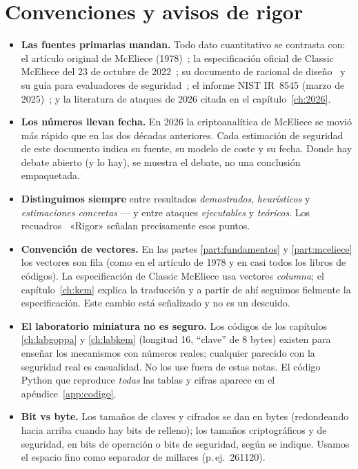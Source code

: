 \documentclass[11pt,a4paper,oneside]{report}
\begin{document}
\section*{Convenciones y avisos de rigor}
\begin{itemize}[leftmargin=1.4em,itemsep=2pt]
  \item \textbf{Las fuentes primarias mandan.} Todo dato cuantitativo se contrasta con:
        el artículo original de McEliece (1978)~\cite{mceliece1978}; la especificación
        oficial de Classic McEliece del 23 de octubre de
        2022~\cite{cmspec}; su documento de racional de diseño~\cite{cmrationale} y su
        guía para evaluadores de seguridad~\cite{cmsecurity}; el informe NIST IR~8545
        (marzo de 2025)~\cite{nist8545}; y la literatura de ataques de 2026 citada en el
        capítulo~\ref{ch:2026}.
  \item \textbf{Los números llevan fecha.} En 2026 la criptoanalítica de McEliece se
        movió más rápido que en las dos décadas anteriores. Cada estimación de seguridad
        de este documento indica su fuente, su modelo de coste y su fecha. Donde hay
        debate abierto (y lo hay), se muestra el debate, no una conclusión empaquetada.
  \item \textbf{Distinguimos siempre} entre resultados \emph{demostrados},
        \emph{heurísticos} y \emph{estimaciones concretas} --- y entre ataques
        \emph{ejecutables} y \emph{teóricos}. Los recuadros
        \textcolor{mcred}{\faBalanceScale\ «Rigor»} señalan precisamente esos puntos.
  \item \textbf{Convención de vectores.} En las partes \ref{part:fundamentos} y
        \ref{part:mceliece} los vectores son fila (como en el artículo de 1978 y en casi
        todos los libros de códigos). La especificación de Classic McEliece usa vectores
        \emph{columna}; el capítulo~\ref{ch:kem} explica la traducción y a partir de ahí
        seguimos fielmente la especificación. Este cambio está señalizado y no es un
        descuido.
  \item \textbf{El laboratorio miniatura no es seguro.} Los códigos de los capítulos
        \ref{ch:labgoppa} y \ref{ch:labkem} (longitud 16, ``clave'' de 8 bytes) existen
        para enseñar los mecanismos con números reales; cualquier parecido con la
        seguridad real es casualidad. No los use fuera de estas notas. El código Python
        que reproduce \emph{todas} las tablas y cifras aparece en el
        apéndice~\ref{app:codigo}.
  \item \textbf{Bit vs byte.} Los tamaños de claves y cifrados se dan en bytes
        (redondeando hacia arriba cuando hay bits de relleno); los tamaños
        criptográficos y de seguridad, en bits de operación o bits de seguridad, según se
        indique. Usamos el espacio fino como separador de millares (p.\,ej.\ \num{261120}).
\end{itemize}
\end{document}
